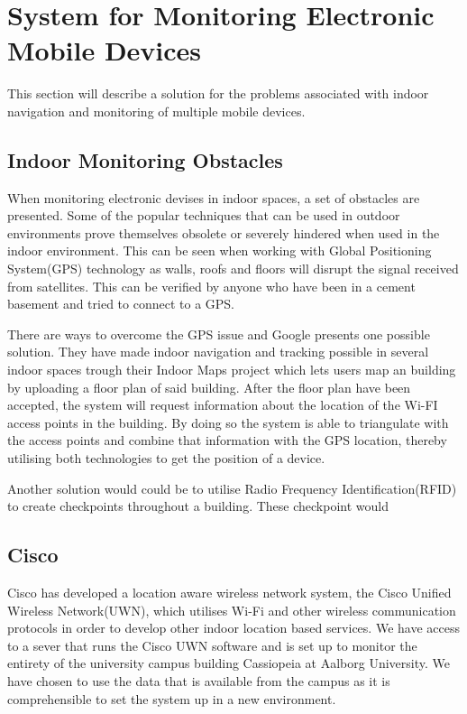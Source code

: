 \section{System for Monitoring Electronic Mobile Devices}\label{sec:monitoring}
This section will describe a solution for the problems associated with indoor navigation and monitoring of multiple mobile devices.    

\subsection{Indoor Monitoring Obstacles}
When monitoring electronic devises in indoor spaces, a set of obstacles are presented. Some of the popular techniques that can be used in outdoor environments prove themselves obsolete or severely hindered when used in the indoor environment. This can be seen when working with Global Positioning System(GPS) technology as walls, roofs and floors will disrupt the signal received from satellites. This can be verified by anyone who have been in a cement basement and tried to connect to a GPS.

There are ways to overcome the GPS issue and Google presents one possible solution. They have made indoor navigation and tracking possible in several indoor spaces trough their Indoor Maps project which lets users map an building by uploading a floor plan of said building. After the floor plan have been accepted, the system will request information about the location of the Wi-FI access points in the building. By doing so the system is able to triangulate with the access points and combine that information with the GPS location, thereby utilising both technologies to get the position of a device.

Another solution would could be to utilise Radio Frequency Identification(RFID) to create checkpoints throughout a building. These checkpoint would 
\cite{indoor_bin}

\subsection{Cisco}\label{subsec:cisco}
Cisco has developed a location aware wireless network system, the Cisco Unified Wireless Network(UWN), which utilises Wi-Fi and other wireless communication protocols in order to develop other indoor location based services\cite{uwn}. We have access to a sever that runs the Cisco UWN software and is set up to monitor the entirety of the university campus building Cassiopeia at Aalborg University. We have chosen to use the data that is available from the campus as it is comprehensible to set the system up in a new environment. 

